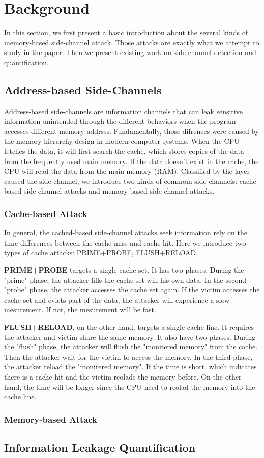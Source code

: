 \section{Background}
In this section, we first present a basic introduction about the 
several kinds of memory-based side-channel attack. Those attacks 
are exactly what we attempt to study in the paper. Then we present
existing work on side-channel detection and quantification.  
\subsection{Address-based Side-Channels}
Address-based side-channels are information channels that can leak sensitive information unintended
through the different behaviors when the program accesses different memory addrsss. Fundamentally,
those difrences were caused by the memory hierarchy design in modern computer systems. When the 
CPU fetches the data, it will first search the cache, which stores copies of the data from 
the frequently used main memory. If the data doesn't exist in the cache, the CPU will read
the data from the main memory (RAM). Classified by the layer caused the side-channel, we 
introduce two kinds of commom side-channels: cache-based side-channel attacks and memory-based
side-channel attacks.

\subsubsection{Cache-based Attack}
In general, the cached-based side-channel attacks seek information 
rely on the time differences between the cache miss
and cache hit. Here we introduce two types of cache attacks:
PRIME+PROBE, FLUSH+RELOAD.

\textbf{PRIME+PROBE} targets a single cache set. It has two phases. During the
"prime" phase, the attacker fills the cache set will his own data.
In the second "probe" phase, the attacker accesses the cache set
again. If the victim accesses the cache set and evicts part of 
the data, the attacker will experience a slow mesurement. If not, 
the mesurement will be fast.

\textbf{FLUSH+RELOAD}, on the other hand, targets a single cache line. 
It requires the attacker and victim share the same memory.
It also have two phases. During the "flush" phase, the attacker 
will flush the "monitered memory" from the cache. Then the attacker
wait for the victim to access the memory. In the third phase, the 
attacker reload the "monitered memory". If the time is short, which
indicates there is a cache hit and the victim reolads the memory before. 
On the other hand, the time will be longer since the CPU need to reolad
the memory into the cache line.



\subsubsection{Memory-based Attack}

\subsection{Information Leakage Quantification}

